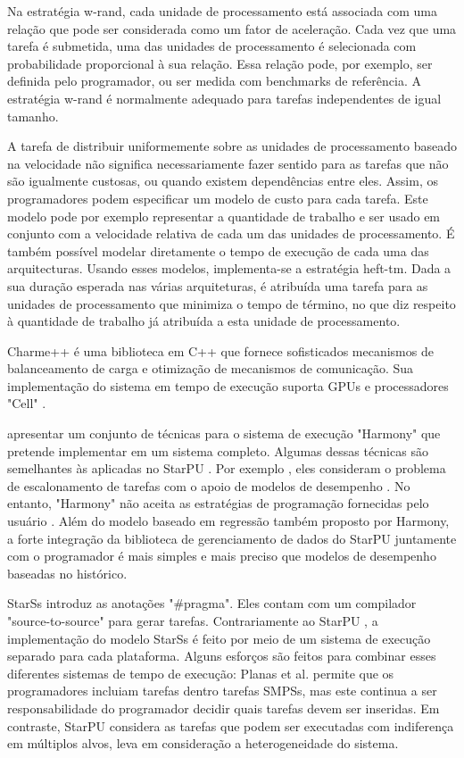 Na estratégia w-rand, cada unidade de processamento está associada com uma relação que pode ser considerada como um fator de aceleração. Cada vez que uma tarefa é submetida, uma das unidades de processamento é selecionada com probabilidade proporcional à sua relação. Essa relação pode, por exemplo, ser definida pelo programador, ou ser medida com benchmarks de referência. A estratégia w-rand é normalmente adequado para tarefas independentes de igual tamanho.

A tarefa de distribuir uniformemente sobre as unidades de processamento baseado na velocidade não significa necessariamente fazer sentido para as tarefas que não são igualmente custosas, ou quando existem dependências entre eles. Assim, os programadores podem especificar um modelo de custo para cada tarefa. Este modelo pode por exemplo representar a quantidade de trabalho e ser usado em conjunto com a velocidade relativa de cada um das unidades de processamento. É também possível modelar diretamente o tempo de execução de cada uma das arquitecturas. Usando esses modelos, implementa-se a estratégia heft-tm. Dada a sua duração esperada nas várias arquiteturas, é atribuída uma tarefa para as unidades de processamento que minimiza o tempo de término, no que diz respeito à quantidade de trabalho já atribuída a esta unidade de processamento.

Charme++ é uma biblioteca em C++ que fornece sofisticados mecanismos de balanceamento de carga e otimização de mecanismos de comunicação. Sua implementação do sistema em tempo de execução suporta GPUs e processadores "Cell" . 

\cite{harmony} apresentar um conjunto de técnicas para o sistema de execução "Harmony" que pretende implementar em um sistema completo. Algumas dessas técnicas são semelhantes às aplicadas no StarPU . Por exemplo , eles consideram o problema de escalonamento de tarefas com o apoio de modelos de desempenho . No entanto, "Harmony" não aceita as estratégias de programação fornecidas pelo usuário . Além do modelo baseado em regressão também proposto por Harmony, a forte integração da biblioteca de gerenciamento de dados do StarPU juntamente com o programador é mais simples e mais preciso que modelos de desempenho baseadas no histórico. 

StarSs \cite{StarSs} introduz  as anotações "\#pragma". Eles contam com um compilador "source-to-source" para gerar tarefas. Contrariamente ao StarPU , a implementação do modelo StarSs é feito por meio de um sistema de execução separado para cada plataforma. Alguns esforços são feitos para combinar esses diferentes sistemas de tempo de execução: Planas et al. permite que os programadores incluiam tarefas dentro tarefas SMPSs, mas este continua a ser responsabilidade do programador decidir quais tarefas devem ser inseridas. Em contraste, StarPU considera as tarefas que podem ser executadas com indiferença em múltiplos alvos, leva em consideração a heterogeneidade do sistema.

